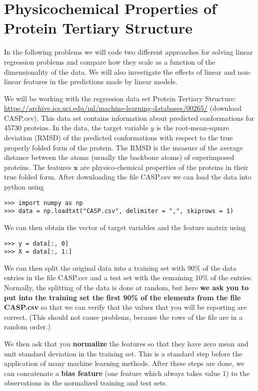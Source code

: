 \documentclass[submit]{harvardml}
\begin{document}
\newpage
\section*{Physicochemical Properties of Protein Tertiary Structure}

In the following problems we will code two different approaches for
solving linear regression problems and compare how they scale as a function of
the dimensionality of the data.  We will also investigate the effects of
linear and non-linear features in the predictions made by linear models.

We will be working with the regression data set Protein
Tertiary Structure:
\url{https://archive.ics.uci.edu/ml/machine-learning-databases/00265/}
(download CASP.csv). This data set contains information about predicted 
conformations for 45730
proteins. In the data, the target variable $y$ is the root-mean-square
deviation (RMSD) of the predicted conformations with respect to the true properly
folded form of the protein. The RMSD is the measure of the average distance
between the atoms (usually the backbone atoms) of superimposed proteins.
The features $\mathbf{x}$ are
physico-chemical properties of the proteins in their true folded form. After
downloading the file CASP.csv we can load the data into python using
\begin{verbatim}
>>> import numpy as np
>>> data = np.loadtxt("CASP.csv", delimiter = ",", skiprows = 1)
\end{verbatim}
We can then obtain the vector of target variables and the feature matrix using
\begin{verbatim}
>>> y = data[:, 0]
>>> X = data[:, 1:]
\end{verbatim}
We can then split the original data into a training set with 90\% of the data
entries in the file CASP.csv and a test set with the remaining 10\% of the
entries. Normally, the splitting of the data is done at random, but here {\bf we ask
you to put into the training set the first 90\% of the elements from the
file CASP.csv} so that we can verify that the values that you will be reporting are correct.
(This should not cause problems, because the rows of the file are in a random order.)

We then ask that you \textbf{normalize} the features so that they have
zero mean and unit standard deviation in the training set. This is a
standard step before the application of many machine learning
methods. After these steps are done, we can concatenate a \textbf{bias
  feature} (one feature which always takes value 1) to the
observations in the normalized training and test sets.
\end{document}
